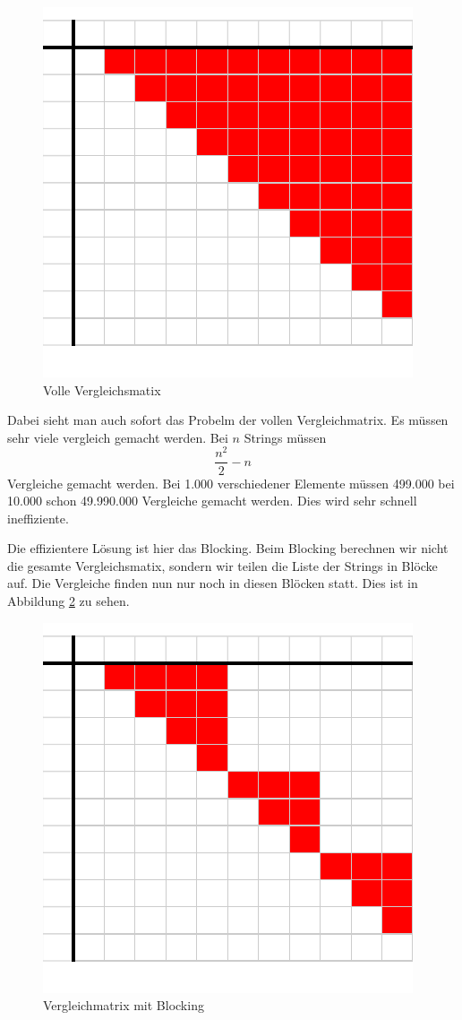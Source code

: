 \documentclass[sigconf]{acmart}
\begin{document}
\begin{figure}[htbp]
  \centering
  \includegraphics{table.pdf}
  \caption{Volle Vergleichsmatix}
  \label{abb:matrix}
\end{figure}

Dabei sieht man auch sofort das Probelm der vollen Vergleichmatrix.
Es müssen sehr viele vergleich gemacht werden. Bei $n$
Strings müssen 
$$\frac{n^2}{2} - n$$ 
Vergleiche gemacht werden. 
Bei 1.000 verschiedener
Elemente müssen 499.000 bei 10.000 schon 49.990.000 Vergleiche 
gemacht werden. Dies wird sehr schnell ineffiziente.

Die effizientere Lösung ist hier das Blocking.
Beim Blocking berechnen wir nicht die gesamte 
Vergleichsmatix, sondern wir teilen die Liste der Strings 
in Blöcke auf. Die Vergleiche finden nun nur noch in diesen
Blöcken statt. Dies ist in Abbildung \ref{abb:matrixblock} zu sehen.

\begin{figure}[htbp]
  \centering
  \includegraphics{table2.pdf}
  \caption{Vergleichmatrix mit Blocking}
  \label{abb:matrixblock}
\end{figure}
\end{document}
